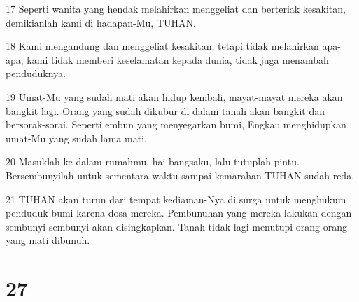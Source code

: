 \par 17 Seperti wanita yang hendak melahirkan menggeliat dan berteriak kesakitan, demikianlah kami di hadapan-Mu, TUHAN.
\par 18 Kami mengandung dan menggeliat kesakitan, tetapi tidak melahirkan apa-apa; kami tidak memberi keselamatan kepada dunia, tidak juga menambah penduduknya.
\par 19 Umat-Mu yang sudah mati akan hidup kembali, mayat-mayat mereka akan bangkit lagi. Orang yang sudah dikubur di dalam tanah akan bangkit dan bersorak-sorai. Seperti embun yang menyegarkan bumi, Engkau menghidupkan umat-Mu yang sudah lama mati.
\par 20 Masuklah ke dalam rumahmu, hai bangsaku, lalu tutuplah pintu. Bersembunyilah untuk sementara waktu sampai kemarahan TUHAN sudah reda.
\par 21 TUHAN akan turun dari tempat kediaman-Nya di surga untuk menghukum penduduk bumi karena dosa mereka. Pembunuhan yang mereka lakukan dengan sembunyi-sembunyi akan disingkapkan. Tanah tidak lagi menutupi orang-orang yang mati dibunuh.

\chapter{27}

